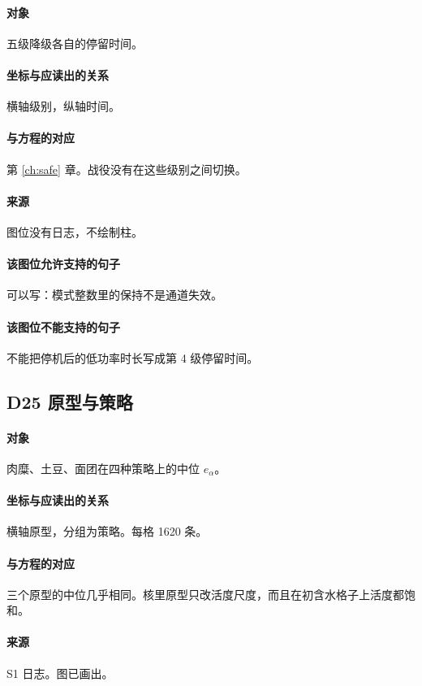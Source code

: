 \paragraph{对象}
五级降级各自的停留时间。

\paragraph{坐标与应读出的关系}
横轴级别，纵轴时间。

\paragraph{与方程的对应}
第 \ref{ch:safe} 章。战役没有在这些级别之间切换。

\paragraph{来源}
图位没有日志，不绘制柱。

\paragraph{该图位允许支持的句子}
可以写：模式整数里的保持不是通道失效。

\paragraph{该图位不能支持的句子}
不能把停机后的低功率时长写成第 4 级停留时间。

\subsection{D25 原型与策略}
\paragraph{对象}
肉糜、土豆、面团在四种策略上的中位 $e_\alpha$。

\paragraph{坐标与应读出的关系}
横轴原型，分组为策略。每格 1620 条。

\paragraph{与方程的对应}
三个原型的中位几乎相同。核里原型只改活度尺度，而且在初含水格子上活度都饱和。

\paragraph{来源}
S1 日志。图已画出。

